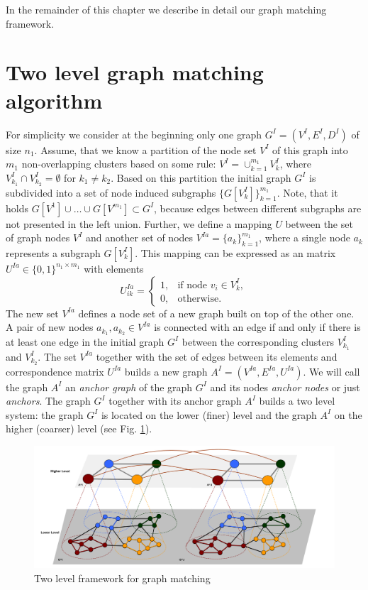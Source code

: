 In the remainder of this chapter we describe in detail our graph matching framework.

\section{Two level graph matching algorithm}
For simplicity we consider at the beginning only one graph $G^I=(V^I,E^I,D^I)$ of size $n_1$. Assume, that we know a partition of the node set $V^I$ of this graph into $m_1$ non-overlapping clusters based on some rule: $V^I=\cup_{k=1}^{m_1}V^I_k$, where $V^I_{k_1}\cap V^I_{k_2}=\emptyset$ for $k_1\not=k_2$. Based on this partition the initial graph $G^I$ is subdivided into a set of node induced subgraphs $\{G[V^I_k]\}_{k=1}^{m_1}$. Note, that it holds $G[V^1]\cup\dots\cup G[V^{m_1}]\subset G^I$, because edges between different subgraphs are not presented in the left union.
Further, we define a mapping $U$ between the set of graph nodes $V^I$ and another set of nodes $V^{Ia}=\{a_k\}_{k=1}^{m_1}$, where a single node $a_k$ represents a subgraph  $G[V^I_k]$. This mapping can be expressed as an matrix $U^{Ia}\in\{0,1\}^{n_1\times m_1}$ with elements 
\begin{equation}\label{eq:matrixU}
U^{Ia}_{ik} = \begin{cases} 1, & \mbox{if node } v_i\in V^I_k,    \\
0, & \mbox{otherwise}.\end{cases}
\end{equation}
The new set $V^{Ia}$ defines a node set of a new graph built on top of the other one. A pair of new nodes $a_{k_1},a_{k_2}\in V^{Ia}$ is connected with an edge if and only if there is at least one edge in the initial graph $G^I$ between the corresponding clusters $V^I_{k_1}$ and $V^I_{k_2}$. The set $V^{Ia}$ together with the set of edges between its elements and correspondence matrix $U^{Ia}$ builds a new graph $A^I=(V^{Ia},E^{Ia},U^{Ia})$. We will call the graph $A^I$ an \emph{anchor graph} of the graph $G^I$ and its nodes \emph{anchor nodes} or just \emph{anchors}. The graph $G^I$ together with its anchor graph $A^I$ builds a two level system: the graph $G^I$ is located on the lower (finer) level and the graph $A^I$ on the higher (coarser) level (see Fig. \ref{fig:2levels}).

\begin{figure} [h!]
	\centering
	\includegraphics[scale=0.35]{chapter2/fig/twolevels3.pdf}
	\caption{Two level framework for graph matching} \label{fig:2levels}
\end{figure}

